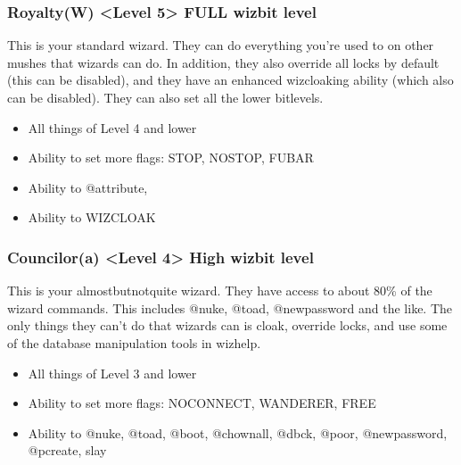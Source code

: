 \documentclass[letterpaper,10pt,english]{sphinxmanual}
\begin{document}
\subsubsection{Royalty(W) \textless{}Level 5\textgreater{} \sphinxhyphen{} FULL wizbit level}
\label{\detokenize{toggles:royalty-w-level-5-full-wizbit-level}}
\sphinxAtStartPar
This is your standard wizard.  They can do everything you’re
used to on other mushes that wizards can do.  In addition, they
also override all locks by default (this can be disabled), and
they have an enhanced wizcloaking ability (which also can be
disabled).  They can also set all the lower bitlevels.
\begin{itemize}
\item {} 
\sphinxAtStartPar
All things of Level 4 and lower

\item {} 
\sphinxAtStartPar
Ability to set more flags: STOP, NOSTOP, FUBAR

\item {} 
\sphinxAtStartPar
Ability to @attribute,

\item {} 
\sphinxAtStartPar
Ability to WIZCLOAK

\end{itemize}


\subsubsection{Councilor(a) \textless{}Level 4\textgreater{} \sphinxhyphen{} High wizbit level}
\label{\detokenize{toggles:councilor-a-level-4-high-wizbit-level}}
\sphinxAtStartPar
This is your almost\sphinxhyphen{}but\sphinxhyphen{}not\sphinxhyphen{}quite wizard.  They have access to
about 80\% of the wizard commands.  This includes @nuke, @toad,
@newpassword and the like.  The only things they can’t do that
wizards can is cloak, override locks, and use some of the
database manipulation tools in wizhelp.
\begin{itemize}
\item {} 
\sphinxAtStartPar
All things of Level 3 and lower

\item {} 
\sphinxAtStartPar
Ability to set more flags: NOCONNECT, WANDERER, FREE

\item {} 
\sphinxAtStartPar
Ability to @nuke, @toad, @boot, @chownall, @dbck, @poor, @newpassword, @pcreate, slay

\end{itemize}
\end{document}
